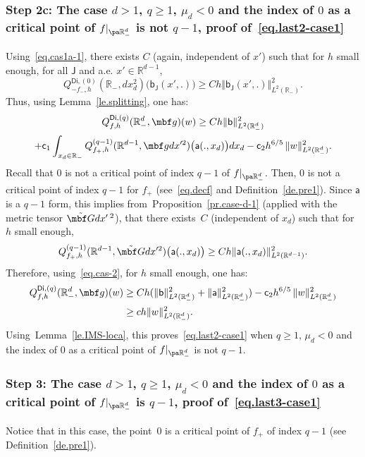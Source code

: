 \subsubsection*{Step 2c: The case $d>1$, $q \ge 1$, $\mu_{d}<0$ and the index
of $0$ as a critical point of $f|_{\pa \mathbb R^{d}_-}$ is not $q-1$, proof of~\eqref{eq.last2-case1}}
Using~\eqref{eq.cas1a-1}, there exists $C$ (again, independent of $x'$) such that for $h$ small enough, for all $\mathsf J$ and a.e. $x'\in \mathbb R^{d-1}$,
\begin{equation}\label{cas-lambda<0}
Q^{\mathsf{Di},(0)}_{-f_-,h}(\mathbb R_-,dx_d^2)\bigl(\mathsf b_{\mathsf J}(x',.)\bigr) \ge Ch \Vert \mathsf b_{\mathsf J}(x',.) \Vert_{L^2(\mathbb R_-)}^2.
\end{equation}
Thus, using Lemma~\ref{le.splitting}, one has:
\begin{multline}\label{eq.cas-2}
Q^{\mathsf{Di},(q)}_{f,h}(\mathbb R_-^d, \mbf g)(w)\ge Ch \Vert \mathsf b \Vert_{L^2(\mathbb R^d_-)}^2\\
+\mathsf c_1\int_{x_d\in \mathbb R_- } Q^{(q-1)}_{f_+,h}(\mathbb R^{d-1}, \mbf gdx'^2)\bigl(\mathsf a(.,x_d)\bigr) dx_d
-\mathsf c_2h^{6/5}\, \Vert w \Vert_{L^2(\mathbb R^d_-)}^2.
\end{multline}
Recall that $0$ is not a critical point of index $q-1$ of $f|_{\pa \mathbb R^{d}_-}$. Then, $0$ is not a critical point of index $q-1$ for $f_+$ (see~\eqref{eq.decf} and Definition~\ref{de.pre1}). Since $\mathsf a$ is a $q-1$ form, this implies from~Proposition~\ref{pr.case-d-1} (applied with the metric tensor $ \tilde {\mbf G}dx'\,^2$), that there exists~$C$ (independent of $x_d$) such that for $h$ small enough,
\[
Q^{(q-1)}_{f_+,h}(\mathbb R^{d-1}, \tilde {\mbf G}dx'^2)\bigl(\mathsf a(.,x_d)\bigr) \ge Ch \Vert \mathsf a(.,x_d) \Vert_{L^2(\mathbb R^{d-1})}^2.
\]
Therefore, using~\eqref{eq.cas-2}, for $h$ small enough, one has:
\[
\begin{aligned}
Q^{\mathsf{Di},(q)}_{f,h}(\mathbb R^{d}_-, \mbf g)(w)&\ge Ch(\Vert
\mathsf b \Vert_{L^2(\mathbb R^d_-)}^2+ \Vert \mathsf a
\Vert_{L^2(\mathbb R^{d}_-)}^2)-\mathsf c_2h^{6/5}\, \Vert w
\Vert_{L^2(\mathbb R^d_-)}^2 \\
&\ge ch \Vert w \Vert_{L^2(\mathbb R^d_-)}^2.
\end{aligned}
\]
Using~Lemma~\ref{le.IMS-loca}, this proves~\eqref{eq.last2-case1} when
$q\ge 1$, $\mu_{d}<0$ and the index of $0$ as a critical point of
$f|_{\pa \mathbb R^{d}_-}$ is not $q-1$.

\subsubsection*{Step 3: The case $d>1$, $q \ge 1$, $\mu_{d}<0$ and the index
of $0$ as a critical point of $f|_{\pa \mathbb R^{d}_-}$ is $q-1$, proof of~\eqref{eq.last3-case1}}
Notice that in this case, the point~$0$ is a critical point of $f_+$ of index $q-1$ (see Definition~\ref{de.pre1}).

